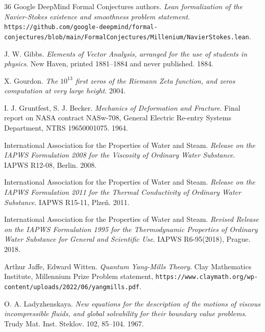 \begin{thebibliography}{36}
Google DeepMind Formal Conjectures authors. \emph{Lean formalization of the Navier-Stokes existence and smoothness problem statement}. \texttt{https:/\allowbreak{}/\allowbreak{}github.com/\allowbreak{}google-deepmind/\allowbreak{}formal-conjectures/\allowbreak{}blob/\allowbreak{}main/\allowbreak{}FormalConjectures/\allowbreak{}Millenium/\allowbreak{}NavierStokes.lean}.

J. W. Gibbs. \emph{Elements of Vector Analysis, arranged for the use of students in physics}. New Haven, printed 1881--1884 and never published. 1884.

X. Gourdon. \emph{The $10^{13}$ first zeros of the Riemann Zeta function, and zeros computation at very large height}. 2004.

I. J. Gruntfest, S. J. Becker. \emph{Mechanics of Deformation and Fracture}. Final report on NASA contract NASw-708, General Electric Re-entry Systems Department, NTRS 19650001075. 1964.

International Association for the Properties of Water and Steam. \emph{Release on the IAPWS Formulation 2008 for the Viscosity of Ordinary Water Substance}. IAPWS R12-08, Berlin. 2008.

International Association for the Properties of Water and Steam. \emph{Release on the IAPWS Formulation 2011 for the Thermal Conductivity of Ordinary Water Substance}. IAPWS R15-11, Plze\v{n}. 2011.

International Association for the Properties of Water and Steam. \emph{Revised Release on the IAPWS Formulation 1995 for the Thermodynamic Properties of Ordinary Water Substance for General and Scientific Use}. IAPWS R6-95(2018), Prague. 2018.

Arthur Jaffe, Edward Witten. \emph{Quantum Yang-Mills Theory}. Clay Mathematics Institute, Millennium Prize Problem statement, \texttt{https:/\allowbreak{}/\allowbreak{}www.claymath.org/\allowbreak{}wp-content/\allowbreak{}uploads/\allowbreak{}2022/\allowbreak{}06/\allowbreak{}yangmills.pdf}.

O. A. Ladyzhenskaya. \emph{New equations for the description of the motions of viscous incompressible fluids, and global solvability for their boundary value problems}. Trudy Mat. Inst. Steklov. 102, 85--104. 1967.


\end{thebibliography}
